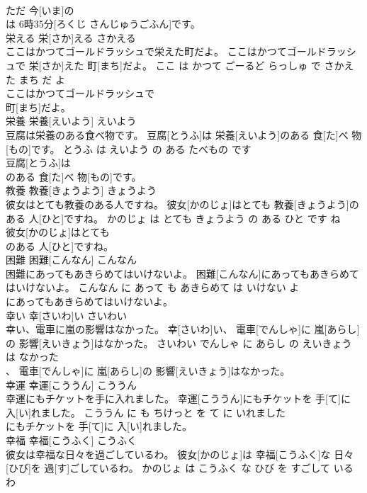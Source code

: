 \documentclass[8pt]{extreport}
\begin{document}
\begin{CJK}{UTF8}{min}
\\	ただ 今[いま]の
\\	は 6時35分[ろくじ さんじゅうごふん]です。			
\\	栄える	栄[さか]える	さかえる	
\\	ここはかつてゴールドラッシュで栄えた町だよ。	ここはかつてゴールドラッシュで 栄[さか]えた 町[まち]だよ。	ここ は かつて ごーるど らっしゅ で さかえた まち だ よ	
\\	ここはかつてゴールドラッシュで
\\	町[まち]だよ。			
\\	栄養	栄養[えいよう]	えいよう	
\\	豆腐は栄養のある食べ物です。	豆腐[とうふ]は 栄養[えいよう]のある 食[た]べ 物[もの]です。	とうふ は えいよう の ある たべもの です	
\\	豆腐[とうふ]は
\\	のある 食[た]べ 物[もの]です。			
\\	教養	教養[きょうよう]	きょうよう	
\\	彼女はとても教養のある人ですね。	彼女[かのじょ]はとても 教養[きょうよう]のある 人[ひと]ですね。	かのじょ は とても きょうよう の ある ひと です ね	
\\	彼女[かのじょ]はとても
\\	のある 人[ひと]ですね。			
\\	困難	困難[こんなん]	こんなん	
\\	困難にあってもあきらめてはいけないよ。	困難[こんなん]にあってもあきらめてはいけないよ。	こんなん に あって も あきらめて は いけない よ	
\\	にあってもあきらめてはいけないよ。			
\\	幸い	幸[さいわ]い	さいわい	
\\	幸い、電車に嵐の影響はなかった。	幸[さいわ]い、 電車[でんしゃ]に 嵐[あらし]の 影響[えいきょう]はなかった。	さいわい でんしゃ に あらし の えいきょう は なかった	
\\	、 電車[でんしゃ]に 嵐[あらし]の 影響[えいきょう]はなかった。			
\\	幸運	幸運[こううん]	こううん	
\\	幸運にもチケットを手に入れました。	幸運[こううん]にもチケットを 手[て]に 入[い]れました。	こううん に も ちけっと を て に いれました	
\\	にもチケットを 手[て]に 入[い]れました。			
\\	幸福	幸福[こうふく]	こうふく	
\\	彼女は幸福な日々を過ごしているわ。	彼女[かのじょ]は 幸福[こうふく]な 日々[ひび]を 過[す]ごしているわ。	かのじょ は こうふく な ひび を すごして いる わ	

\end{CJK}
\end{document}
